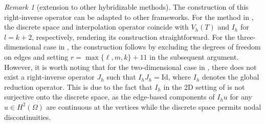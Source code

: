 \documentclass[a4paper]{amsart}
\numberwithin{equation}{section}
\theoremstyle{definition}
\theoremstyle{remark}
\newtheorem{remark}[theorem]{Remark}
\numberwithin{theorem}{section}
\numberwithin{equation}{section}
\numberwithin{table}{section}
\numberwithin{figure}{section}
\begin{document}
\begin{remark}[extension to other hybridizable methods]
    The construction of this right-inverse operator can be adapted to other frameworks. For the method in \cite{LiWangWangZhang2024}, the discrete space and interpolation operator coincide with $V_h(T)$ and $I_h$ for $l=k+2$, respectively, rendering its construction straightforward. For the three-dimensional case in \cite{DongErn2022}, the construction follows by excluding the degrees of freedom on edges and setting $r =  \max\{\ell,m,k\} + 11$ in the subsequent argument. However, it is worth noting that for the two-dimensional case in \cite{DongErn2022}, there does not exist a right-inverse operator $J_h$ such that $I_h J_h= \mathrm{Id}$, where $I_h$ denotes the global reduction operator. This is due to the fact that $I_h$ in the 2D setting of \cite{DongErn2022} is not surjective onto the discrete space,  as the edge-based components of $I_h u$ for any $u\in H^2(\Omega)$ are continuous at the vertices while the discrete space permits nodal discontinuities.
\end{remark}
\end{document}
